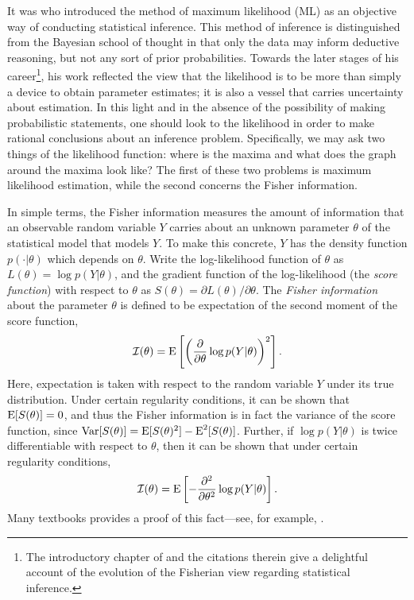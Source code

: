 It was \citet{ra1922mathematical} who introduced the method of maximum likelihood (ML) as an objective way of conducting statistical inference.
This method of inference is distinguished from the Bayesian school of thought in that only the data may inform deductive reasoning, but not any sort of  prior probabilities.
Towards the later stages of his career\footnote{The introductory chapter of \citet{pawitan2001all} and the citations therein give a delightful  account of the evolution of the Fisherian view regarding statistical inference.}, his work reflected the view that the likelihood is to be more than simply a device to obtain parameter estimates; it is also a vessel that carries uncertainty about estimation.
In this light and in the absence of the possibility of making probabilistic statements, one should look to the likelihood in order to make rational conclusions about an inference problem.
Specifically, we may ask two things of the likelihood function: where is the maxima and what does the graph around the maxima look like?
The first of these two problems is maximum likelihood estimation, while the second concerns the Fisher information.

In simple terms, the Fisher information measures the amount of information that an observable random variable $Y$ carries about an unknown parameter $\theta$ of the statistical model that models $Y$.
To make this concrete, $Y$ has the density function $p(\cdot|\theta)$ which depends on $\theta$.
Write the log-likelihood function of $\theta$ as $L(\theta) = \log p(Y|\theta)$, and the gradient function of the log-likelihood (the \emph{score function}) with respect to $\theta$ as $S(\theta) = \partial L(\theta)/\partial\theta$.
The \emph{Fisher information} about the parameter $\theta$ is defined to be expectation of the second moment of the score function, 
\[
  {\mathcal I}(\theta) = \operatorname{E}\left[\left(\frac{\partial}{\partial\theta} \log p(Y|\theta)\right)^2\right].
\]
Here, expectation is taken with respect to the random variable $Y$ under its true distribution.
Under certain regularity conditions, it can be shown that $\operatorname{E}[S(\theta)] = 0$, and thus the Fisher information is in fact the variance of the score function, since $\operatorname{Var}[S(\theta)] = \operatorname{E}[S(\theta)^2] - \operatorname{E}^2[S(\theta)]$.
Further, if $\log p(Y|\theta)$ is twice differentiable with respect to $\theta$, then it can be shown that under certain regularity conditions,
\[
  {\mathcal I}(\theta) = \operatorname{E}\left[-\frac{\partial ^ 2}{\partial\theta^2} \log p(Y|\theta)\right].
\]
Many textbooks provides a proof of this fact---see, for example, \citet[§9.7]{wasserman2013all}.

